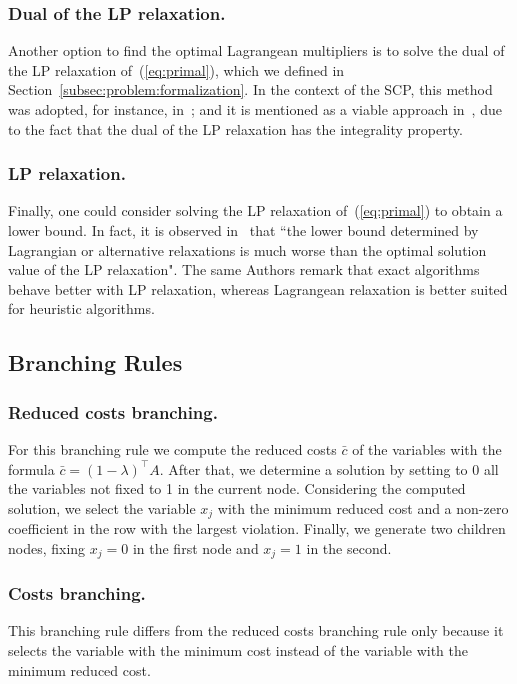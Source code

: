\documentclass[runningheads]{llncs}
\begin{document}
\subsubsection{Dual of the LP relaxation.} Another option to find the optimal Lagrangean multipliers is to solve the dual of the LP relaxation of~(\ref{eq:primal}), which we defined in Section~\ref{subsec:problem:formalization}. In the context of the SCP, this method was adopted, for instance, in~\cite{beasley-1987-algorithm,balas-ho-2009-set-covering}; and it is mentioned as a viable approach in~\cite{caprara-2000-algorithms}, due to the fact that the dual of the LP relaxation has the integrality property.

\subsubsection{LP relaxation.} Finally, one could consider solving the LP relaxation of~(\ref{eq:primal}) to obtain a lower bound. In fact, it is observed in~\cite{caprara-2000-algorithms} that ``the lower bound determined by Lagrangian or alternative relaxations is much worse than the optimal solution value of the LP relaxation". The same Authors remark that exact algorithms behave better with LP relaxation, whereas Lagrangean relaxation is better suited for heuristic algorithms.   

\subsection{Branching Rules}
\label{subsec:branch-bound:branch}

\subsubsection{Reduced costs branching.} For this branching rule we compute the reduced costs $\bar{c}$ of the variables with the formula $\bar{c} = (1 - \lambda)^\top A$. After that, we determine a solution by setting to 0 all the variables not fixed to 1 in the current node. Considering the computed solution, we select the variable $x_j$ with the minimum reduced cost and a non-zero coefficient in the row with the largest violation. Finally, we generate two children nodes, fixing $x_j = 0$ in the first node and $x_j = 1$ in the second.

\subsubsection{Costs branching.} This branching rule differs from the reduced costs branching rule only because it selects the variable with the minimum cost instead of the variable with the minimum reduced cost.
\end{document}
